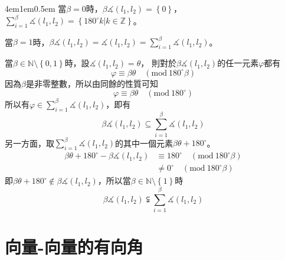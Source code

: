 \documentclass[12pt]{article}
\begin{document}
\begin{mybox}[證明]{4em}{1em}{0.5em}
    當$\beta=0$時，$\beta\measuredangle{\left(l_1,l_2\right)}=\left\{0\right\}$，$\sum\limits_{i=1}^{\beta}{\measuredangle{\left(l_1,l_2\right)}}=\left\{180^{\circ}k\left|k\in\mathbb{Z}\right.\right\}$。
    
    當$\beta=1$時，$\beta\measuredangle{\left(l_1,l_2\right)}=\measuredangle{\left(l_1,l_2\right)}=\sum\limits_{i=1}^{\beta}{\measuredangle{\left(l_1,l_2\right)}}$。

    當$\beta\in\mathbb{N}\setminus\left\{0,1\right\}$時，設$\measuredangle{\left(l_1,l_2\right)}=\theta$，
    則對於$\beta\measuredangle{\left(l_1,l_2\right)}$的任一元素$\varphi$都有
    $$
        \varphi\equiv\beta\theta\quad\left(\text{mod}\ {180^{\circ}\beta}\right)
    $$
    因為$\beta$是非零整數，所以由同餘的性質可知
    $$
        \varphi\equiv\beta\theta\quad\left(\text{mod}\ {180^{\circ}}\right)
    $$
    所以有$\varphi\in\sum\limits_{i=1}^{\beta}{\measuredangle{\left(l_1,l_2\right)}}$，即有
    $$
        \beta\measuredangle{\left(l_1,l_2\right)}\subseteq\sum\limits_{i=1}^{\beta}{\measuredangle{\left(l_1,l_2\right)}}
    $$
    另一方面，取$\sum\limits_{i=1}^{\beta}{\measuredangle{\left(l_1,l_2\right)}}$的其中一個元素$\beta\theta+180^{\circ}$。
    \begin{align*}
        \beta\theta+180^{\circ}-\beta\measuredangle{\left(l_1,l_2\right)}&\equiv180^{\circ}\quad\left(\text{mod}\ {180^{\circ}\beta}\right)\\
        &\neq0^{\circ}\quad\left(\text{mod}\ {180^{\circ}\beta}\right)
    \end{align*}
    即$\beta\theta+180^{\circ}\notin\beta\measuredangle{\left(l_1,l_2\right)}$，所以當$\beta\in\mathbb{N}\setminus\left\{1\right\}$時
    $$
        \beta\measuredangle{\left(l_1,l_2\right)}\subsetneqq\sum\limits_{i=1}^{\beta}{\measuredangle{\left(l_1,l_2\right)}}
    $$
\end{mybox}
\newpage
\section{向量-向量的有向角}
\end{document}
